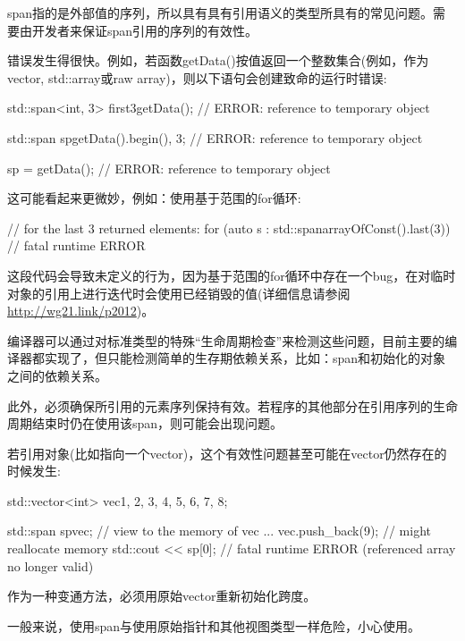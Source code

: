 span指的是外部值的序列，所以具有具有引用语义的类型所具有的常见问题。需要由开发者来保证span引用的序列的有效性。

错误发生得很快。例如，若函数getData()按值返回一个整数集合(例如，作为vector, std::array或raw array)，则以下语句会创建致命的运行时错误:

\begin{cpp}
std::span<int, 3> first3{getData()}; // ERROR: reference to temporary object

std::span sp{getData().begin(), 3}; // ERROR: reference to temporary object

sp = getData(); // ERROR: reference to temporary object
\end{cpp}

这可能看起来更微妙，例如：使用基于范围的for循环:

\begin{cpp}
// for the last 3 returned elements:
for (auto s : std::span{arrayOfConst()}.last(3)) // fatal runtime ERROR
\end{cpp}

这段代码会导致未定义的行为，因为基于范围的for循环中存在一个bug，在对临时对象的引用上进行迭代时会使用已经销毁的值(详细信息请参阅\url{http://wg21.link/p2012})。

编译器可以通过对标准类型的特殊“生命周期检查”来检测这些问题，目前主要的编译器都实现了，但只能检测简单的生存期依赖关系，比如：span和初始化的对象之间的依赖关系。

此外，必须确保所引用的元素序列保持有效。若程序的其他部分在引用序列的生命周期结束时仍在使用该span，则可能会出现问题。

若引用对象(比如指向一个vector)，这个有效性问题甚至可能在vector仍然存在的时候发生:

\begin{cpp}
std::vector<int> vec{1, 2, 3, 4, 5, 6, 7, 8};

std::span sp{vec}; // view to the memory of vec
...
vec.push_back(9); // might reallocate memory
std::cout << sp[0]; // fatal runtime ERROR (referenced array no longer valid)
\end{cpp}

作为一种变通方法，必须用原始vector重新初始化跨度。

一般来说，使用span与使用原始指针和其他视图类型一样危险，小心使用。


































